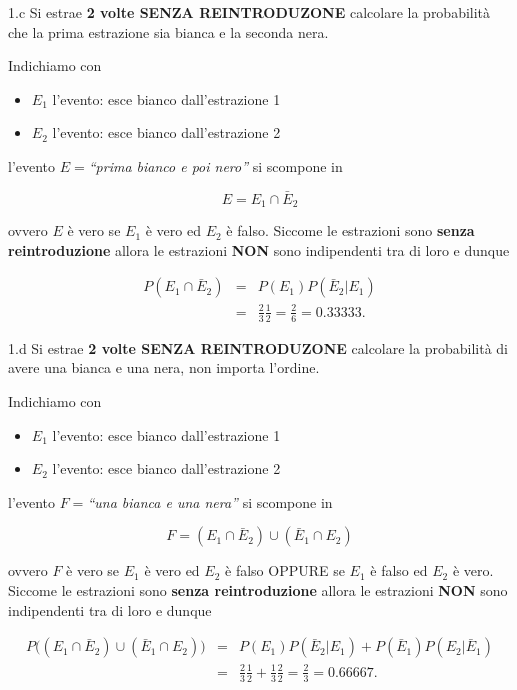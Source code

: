 \documentclass[
  11pt,
]{book}
\providecommand{\tightlist}{%
  \setlength{\itemsep}{0pt}\setlength{\parskip}{0pt}}
\theoremstyle{mytheoremstyle}
\theoremstyle{mydefstyle}
\newenvironment{sol}
  {
  \begin{tcolorbox}[enhanced,breakable,arc=0.1mm,boxrule=1pt,colback=white,colframe=iblue,
  title=\bf \fontfamily{lmss}\selectfont \hspace{.5 cm} Soluzione,drop fuzzy shadow]

}{
\end{tcolorbox}
  }
\begin{document}
1.c Si estrae \textbf{2 volte SENZA REINTRODUZONE} calcolare la probabilità che
la prima estrazione sia bianca e la seconda nera.

\begin{sol}
Indichiamo con

\begin{itemize}
\tightlist
\item
  \(E_1\) l'evento: esce bianco dall'estrazione 1
\item
  \(E_2\) l'evento: esce bianco dall'estrazione 2
\end{itemize}

l'evento \(E=\)\emph{``prima bianco e poi nero''} si scompone in

\[
E=E_1\cap\bar E_2
\]

ovvero \(E\) è vero se \(E_1\) è vero ed \(E_2\) è falso. Siccome le estrazioni sono
\textbf{senza reintroduzione} allora le estrazioni \textbf{NON} sono indipendenti tra di loro e dunque

\begin{eqnarray*}
    P(E_1 \cap \bar E_2)
&=& P(E_1)P(\bar E_2|E_1)\\
&=& \frac{2}{3} \frac{1}{2}
 =  \frac{2}{6}
 =  0.33333.
\end{eqnarray*}

\end{sol}

1.d Si estrae \textbf{2 volte SENZA REINTRODUZONE} calcolare la probabilità di avere
una bianca e una nera, non importa l'ordine.

\begin{sol}
Indichiamo con

\begin{itemize}
\tightlist
\item
  \(E_1\) l'evento: esce bianco dall'estrazione 1
\item
  \(E_2\) l'evento: esce bianco dall'estrazione 2
\end{itemize}

l'evento \(F=\)\emph{``una bianca e una nera''} si scompone in

\[
F=(E_1\cap\bar E_2)\cup(\bar E_1\cap E_2)
\]

ovvero \(F\) è vero se \(E_1\) è vero ed \(E_2\) è falso OPPURE se \(E_1\) è falso ed \(E_2\) è vero.
Siccome le estrazioni sono \textbf{senza reintroduzione} allora le estrazioni \textbf{NON} sono indipendenti
tra di loro e dunque

\begin{eqnarray*}
    P\big((E_1\cap\bar E_2)\cup(\bar E_1\cap E_2)\big)
&=& P(E_1)P(\bar E_2|E_1)+P(\bar E_1)P(E_2|\bar E_1)\\
&=& \frac{2}{3} \frac{1}{2} + \frac{1}{3} \frac{2}{2} 
 =  \frac{2}{3}
 =  0.66667.
\end{eqnarray*}

\end{sol}
\end{document}
